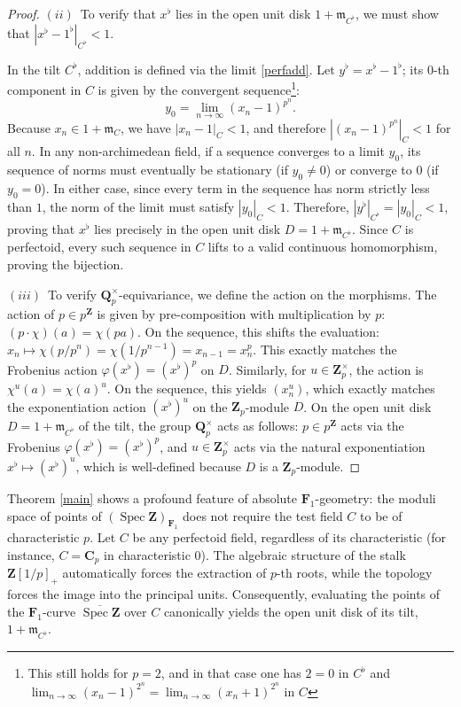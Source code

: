 \documentclass[11pt,a4paper]{article}
\newcommand{\C}{\mathbf{C}}
\newcommand{\Q}{\mathbf{Q}}
\newcommand{\Z}{\mathbf{Z}}
\newcommand{\Fone}{\mathbf{F}_{1}}
\def\spzb{\overline{\Spec \Z}}
\def\spzf{(\Spec \Z)_{\mathbf{F}_{1}}}
\newcommand{\Spec}{\operatorname{Spec}}
\begin{document}
\begin{proof}
$(ii)$~To verify that $x^\flat$ lies in the open unit disk $1 + \mathfrak{m}_{C^\flat}$, we must show that $|x^\flat - 1^\flat|_{C^\flat} < 1$. 

In the tilt $C^\flat$, addition is defined via the limit \eqref{perfadd}. Let $y^\flat = x^\flat - 1^\flat$; its $0$-th component in $C$ is given by the convergent sequence\footnote{This still holds for $p=2$, and in that case one has $2=0$ in $C^\flat$ and $\lim _{n \rightarrow \infty}\left(x_n-1\right)^{2^n}=\lim _{n \rightarrow \infty}\left(x_n+1\right)^{2^n}$ in $C$}:
\[
y_0 = \lim_{n \to \infty} (x_n - 1)^{p^n}.
\]
Because $x_n \in 1 + \mathfrak{m}_C$, we have $|x_n - 1|_C < 1$, and therefore $|(x_n - 1)^{p^n}|_C < 1$ for all $n$. In any non-archimedean field, if a sequence converges to a limit $y_0$, its sequence of norms must eventually be stationary (if $y_0 \neq 0$) or converge to $0$ (if $y_0 = 0$). In either case, since every term in the sequence has norm strictly less than $1$, the norm of the limit must satisfy $|y_0|_C < 1$. Therefore, $|y^\flat|_{C^\flat} = |y_0|_C < 1$, proving that $x^\flat$ lies precisely in the open unit disk $D = 1 + \mathfrak{m}_{C^\flat}$. Since $C$ is perfectoid, every such sequence in $C$ lifts to a valid continuous homomorphism, proving the bijection.

$(iii)$~To verify $\Q_p^\times$-equivariance, we define the action on the morphisms. The action of $p \in p^\Z$ is given by pre-composition with multiplication by $p$: $(p \cdot \chi)(a) = \chi(pa)$. On the sequence, this shifts the evaluation: $x_n \mapsto \chi(p/p^n) = \chi(1/p^{n-1}) = x_{n-1} = x_n^p$. This exactly matches the Frobenius action $\varphi(x^\flat) = (x^\flat)^p$ on $D$. 
Similarly, for $u \in \Z_p^\times$, the action is $\chi^u(a) = \chi(a)^u$. On the sequence, this yields $(x_n^u)$, which exactly matches the exponentiation action $(x^\flat)^u$ on the $\Z_p$-module $D$.
On the open unit disk $D = 1 + \mathfrak{m}_{C^\flat}$ of the tilt, the group $\Q_p^\times$ acts as follows: $p \in p^\Z$ acts via the Frobenius $\varphi(x^\flat) = (x^\flat)^p$, and $u \in \Z_p^\times$ acts via the natural exponentiation $x^\flat \mapsto (x^\flat)^u$, which is well-defined because $D$ is a $\Z_p$-module.
\end{proof}
    

Theorem \ref{main} shows a profound feature of absolute $\Fone$-geometry: the moduli space of points of $\spzf$ does not require the test field $C$ to be of characteristic $p$. Let $C$ be any  perfectoid field, regardless of its characteristic (for instance, $C = \C_p$ in characteristic $0$). The algebraic structure of the stalk $\Z[1/p]_+$ automatically forces the extraction of $p$-th roots, while the  topology forces the image into the principal units. Consequently, evaluating the  points of the $\Fone$-curve $\spzb$ over $C$ canonically yields the open unit disk of its tilt, $1 + \mathfrak{m}_{C^\flat}$. 
\end{document}
